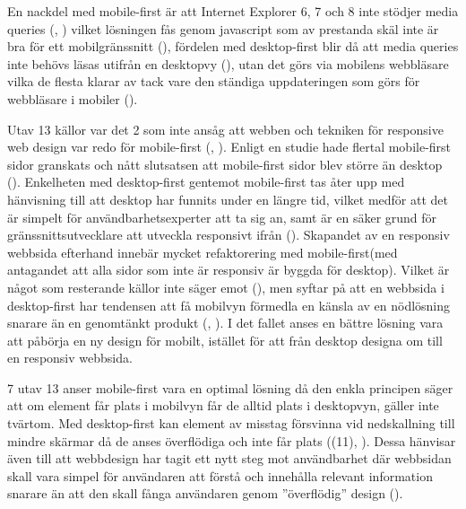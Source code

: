 \documentclass[11pt]{article}
\begin{document}
 En nackdel med mobile-first är att Internet Explorer 6, 7 och 8 inte stödjer media queries (\cite{marcuspope}, \cite{neocreo}) vilket lösningen fås genom javascript som av prestanda skäl inte är bra för ett mobilgränssnitt (\cite{responsivedesign}), fördelen med desktop-first blir då att media queries inte behövs läsas utifrån en desktopvy (\cite{neocreo}), utan det görs via mobilens webbläsare vilka de flesta klarar av tack vare den ständiga uppdateringen som görs för webbläsare i mobiler (\cite{webinsation}).
 
 Utav 13 källor var det 2 som inte ansåg att webben och tekniken för responsive web design var redo för mobile-first (\cite{cloudfour}, \cite{armstrong}). Enligt en studie hade flertal mobile-first sidor granskats och nått slutsatsen att mobile-first sidor blev större än desktop (\cite{cloudfour}). Enkelheten med desktop-first gentemot mobile-first tas åter upp med hänvisning till att desktop har funnits under en längre tid, vilket medför att det är simpelt för användbarhetsexperter att ta sig an, samt är en säker grund för gränssnittsutvecklare att utveckla responsivt ifrån (\cite{armstrong}). Skapandet av en responsiv webbsida efterhand innebär mycket refaktorering med mobile-first(med antagandet att alla sidor som inte är responsiv är byggda för desktop). Vilket är något som resterande källor inte säger emot (\cite{neocreo}), men syftar på att en webbsida i desktop-first har tendensen att få mobilvyn förmedla en känsla av en nödlösning snarare än en genomtänkt produkt (\cite{designshack}, \cite{othermedia}). I det fallet anses en bättre lösning vara att påbörja en ny design för mobilt, istället för att från desktop designa om till en responsiv webbsida.
 
7 utav 13 anser mobile-first vara en optimal lösning då den enkla principen säger att om element får plats i mobilvyn får de alltid plats i desktopvyn, gäller inte tvärtom. Med desktop-first kan element av misstag försvinna vid nedskallning till mindre skärmar då de anses överflödiga och inte får plats (\cite{blogskent}(11), \cite{responsivedesign}). Dessa hänvisar även till att webbdesign har tagit ett nytt steg mot användbarhet där webbsidan skall vara simpel för användaren att förstå och innehålla relevant information snarare än att den skall fånga användaren genom ”överflödig” design (\cite{blogskent}). 
\end{document}
